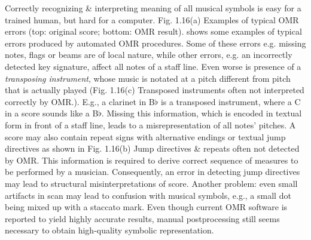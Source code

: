 \documentclass{article}
\begin{document}
\begin{itemize}
\begin{itemize}
\begin{itemize}
			Correctly recognizing \& interpreting meaning of all musical symbols is easy for a trained human, but hard for a computer. {\sf Fig. 1.16(a) Examples of typical OMR errors (top: original score; bottom: OMR result).} shows some examples of typical errors produced by automated OMR procedures. Some of these errors e.g. missing notes, flags or beams are of local nature, while other errors, e.g. an incorrectly detected key signature, affect all notes of a staff line. Even worse is presence of a {\it transposing instrument}, whose music is notated at a pitch different from pitch that is actually played ({\sf Fig. 1.16(c) Transposed instruments often not interpreted correctly by OMR.}). E.g., a clarinet in B$\flat$ is a transposed instrument, where a C in a score sounds like a B$\flat$. Missing this information, which is encoded in textual form in front of a staff line, leads to a misrepresentation of all notes' pitches. A score may also contain repeat signs with alternative endings or textual jump directives as shown in {\sf Fig. 1.16(b) Jump directives \& repeats often not detected by OMR.} This information is required to derive correct sequence of measures to be performed by a musician. Consequently, an error in detecting jump directives may lead to structural misinterpretations of score. Another problem: even small artifacts in scan may lead to confusion with musical symbols, e.g., a small dot being mixed up with a staccato mark. Even though current OMR software is reported to yield highly accurate results, manual postprocessing still seems necessary to obtain high-quality symbolic representation.
			

\end{itemize}
\end{itemize}
\end{itemize}
\end{document}
